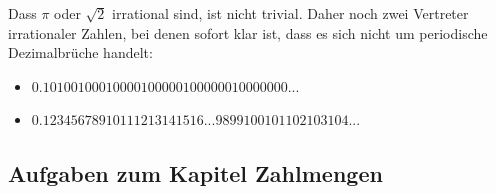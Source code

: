 Dass $\pi$ oder $\sqrt{2}$ irrational sind, ist nicht trivial. Daher
noch zwei Vertreter irrationaler Zahlen, bei denen sofort klar ist,
dass es sich nicht um periodische Dezimalbrüche handelt:
\begin{itemize}
\item $0.10 100 100010000100000100000010000000...$
\item $0.12345678910111213141516 ... 9899100101102103104 ... $
\end{itemize}
\newpage


\subsection*{Aufgaben zum Kapitel Zahlmengen}


